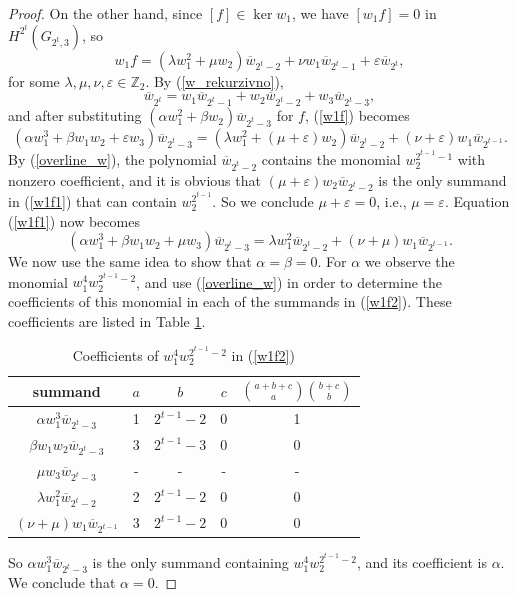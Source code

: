 \documentclass{amsart}
\theoremstyle{definition}
\theoremstyle{remark}
\numberwithin{equation}{section}
\begin{document}
\begin{proof}
    On the other hand, since $[f]\in \ker w_1$, we have $[w_1f] = 0$ in $H^{2^t}(G_{2^t,3})$, so
    \begin{equation}\label{w1f}
        w_1f = (\lambda w_1^2 + \mu w_2) \overline w_{2^t-2} + \nu w_1 \overline w_{2^t-1} + \varepsilon \overline w_{2^t},
    \end{equation}
    for some $\lambda, \mu, \nu, \varepsilon\in\mathbb Z_2$. By (\ref{w_rekurzivno}),
    \[\overline w_{2^t} = w_1\overline w_{2^t-1} + w_2\overline w_{2^t-2} + w_3\overline w_{2^t-3},\]
    and after substituting $(\alpha w_1^2 + \beta w_2)\overline w_{2^t-3}$ for $f$, (\ref{w1f}) becomes
    \begin{equation} \label{w1f1}
        (\alpha w_1^3 + \beta w_1 w_2 + \varepsilon w_3)\overline w_{2^t-3} = (\lambda w_1^2 + (\mu+ \varepsilon) w_2) \overline w_{2^t-2} + (\nu + \varepsilon)w_1\overline w_{2^{t-1}}.
    \end{equation}
By (\ref{overline_w}), the polynomial $\overline w_{2^t-2}$ contains the monomial $w_2^{2^{t-1}-1}$ with nonzero coefficient, and it is obvious that $(\mu+ \varepsilon) w_2\overline w_{2^t-2}$ is the only summand in (\ref{w1f1}) that can contain $w_2^{2^{t-1}}$. So we conclude $\mu+ \varepsilon=0$, i.e., $\mu = \varepsilon$. Equation (\ref{w1f1}) now becomes
    \begin{equation}\label{w1f2}
        (\alpha w_1^3 + \beta w_1 w_2 + \mu w_3)\overline w_{2^t-3} = \lambda w_1^2 \overline w_{2^t-2} + (\nu + \mu)w_1\overline w_{2^{t-1}}.
    \end{equation}
We now use the same idea to show that $\alpha =\beta = 0$. For $\alpha$ we observe the monomial $w_1^4w_2^{2^{t-1}-2}$, and use (\ref{overline_w}) in order to determine the coefficients of this monomial in each of the summands in (\ref{w1f2}). These coefficients are listed in Table \ref{tab:alpha}.
\begin{table}[h]
\renewcommand{\arraystretch}{1.5} %
\begin{tabular}{|c|c|c|c|c|}
 \hline
summand & $a$ & $b$ & $c$ &  $\binom{a+b+c}{a}\binom{b+c}{b}$ \\ [1ex]
 \hline
$\alpha w_1^3\overline w_{2^t-3}$ & 1 & $2^{t-1}-2$ & 0 &   1\\ 
$\beta w_1w_2\overline w_{2^t-3}$ & 3 & $2^{t-1}-3$ & 0 &   0\\
$\mu w_3\overline w_{2^t-3}$ & - & - & - &   -\\
$\lambda w_1^2 \overline w_{2^t-2}$ & 2 & $2^{t-1}-2$ & 0 &   0\\
$(\nu + \mu)w_1\overline w_{2^{t-1}}$ & 3 & $2^{t-1}-2$ & 0 &   0\\
 \hline
  \end{tabular}
\caption{\label{tab:alpha} Coefficients of $w_1^4w_2^{2^{t-1}-2}$ in (\ref{w1f2})}
\end{table}
So $\alpha w_1^3\overline w_{2^t-3}$ is the only summand containing $w_1^4w_2^{2^{t-1}-2}$, and its coefficient is $\alpha$. We conclude that $\alpha =0$.


\end{proof}
\end{document}
